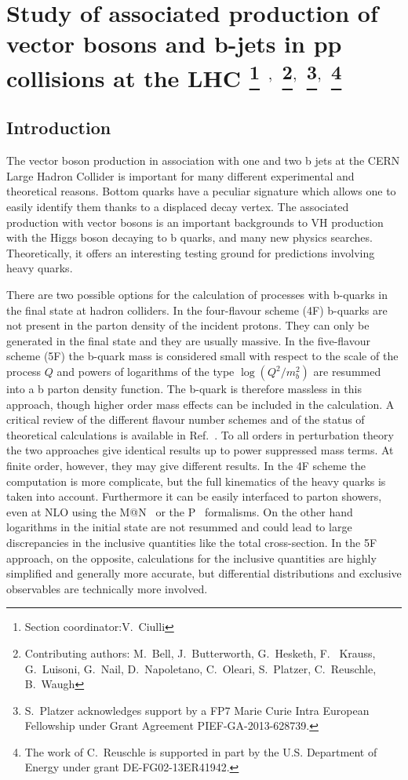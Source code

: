 \documentclass[11pt]{cernrep}
\makeatletter
\newcommand{\Powheg}{P\protect\scalebox{0.8}{OWHEG}\xspace}
\newcommand{\MCatNLO}{M\protect\scalebox{0.8}{C}@N\protect\scalebox{0.8}{LO}\xspace}
\makeatother
\begin{document}
\section{Study of associated production of vector bosons and b-jets in
  pp collisions at the LHC  \protect\footnote{Section
    coordinator:V.~Ciulli} $^{,}$ \protect\footnote{Contributing authors:
    M.~Bell, J.~Butterworth,
    G.~Hesketh, F. ~Krauss, G.~Luisoni, G.~Nail, D.~Napoletano,
    C.~Oleari, S.~Platzer, C.~Reuschle, B.~Waugh}$^{,}$
  \protect\footnote{S.~Platzer acknowledges support by a FP7 Marie
    Curie Intra European Fellowship under Grant Agreement PIEF-GA-2013-628739.}$^{,}$
\protect\footnote{The work of C.~Reuschle is supported in part by the U.S. Department of Energy under grant DE-FG02-13ER41942.} \label{thisLH_Vbb}}

\subsection{Introduction}

The vector boson production in association with one and two b jets at the
CERN Large Hadron Collider is important for many different experimental and
theoretical reasons. Bottom quarks have a peculiar signature which allows one
to easily identify them thanks to a displaced decay vertex. The associated
production with vector bosons is an important backgrounds to VH production
with the Higgs boson decaying to b quarks, and many new physics
searches. Theoretically, it offers an interesting testing ground for
predictions involving heavy quarks.

There are two possible options for the calculation of processes with b-quarks
in the final state at hadron colliders. In the four-flavour scheme (4F)
b-quarks are not present in the parton density of the incident protons. They
can only be generated in the final state and they are usually massive. In the
five-flavour scheme (5F) the b-quark mass is considered small with respect to
the scale of the process $Q$ and powers of logarithms of the type
$\log(Q^2/m_b^2)$ are resummed into a b parton density function. The
b-quark is therefore massless in this approach, though higher order mass
effects can be included in the calculation. A critical review of the
different flavour number schemes and of the status of theoretical
calculations is available in Ref.~\cite{Maltoni:2012pa}. To all orders
in perturbation theory the two approaches give identical results up to
power suppressed mass terms. At finite order, however, they may give
different results. In the 4F scheme the computation is more
complicate, but the full kinematics of the heavy quarks is taken into
account. Furthermore it can be easily interfaced to parton showers, even at
NLO using the \MCatNLO~\cite{Frixione:2002ik} or the
\Powheg~\cite{Nason:2004rx} formalisms.  On the other hand logarithms in the
initial state are not resummed and could lead to large discrepancies in the
inclusive quantities like the total cross-section. In the 5F approach, on the
opposite, calculations for the inclusive quantities are highly simplified and
generally more accurate, but differential distributions and exclusive
observables are technically more involved.
\end{document}
